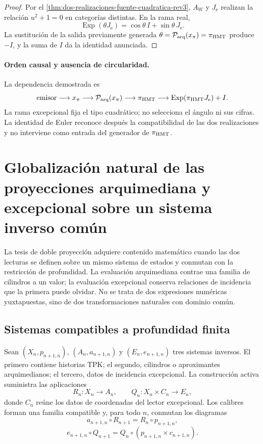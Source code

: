 \begin{proof}
Por el \cref{thm:dos-realizaciones-fuente-cuadratica-rev3}, \(A_W\) y
\(J_{\mathrm e}\) realizan la relación \(u^2+1=0\) en categorías distintas.
En la rama real,
\[
 \operatorname{Exp}(\theta J_{\mathrm e})
 =\cos\theta\,I+\sin\theta\,J_{\mathrm e}.
\]
La sustitución de la salida previamente generada
\(\theta=\mathcal P_{\rm arq}(x_\pi)=\pi_{\rm HMT}\) produce \(-I\), y la
suma de \(I\) da la identidad anunciada.
\end{proof}

\paragraph{Orden causal y ausencia de circularidad.}
La dependencia demostrada es
\[
 \text{emisor}
 \longrightarrow x_\pi
 \longrightarrow\mathcal P_{\rm arq}(x_\pi)
 \longrightarrow\pi_{\rm HMT}
 \longrightarrow
 \operatorname{Exp}(\pi_{\rm HMT}J_{\mathrm e})+I.
\]
La rama excepcional fija el tipo cuadrático; no selecciona el ángulo ni sus
cifras. La identidad de Euler reconoce después la compatibilidad de las dos
realizaciones y no interviene como entrada del generador de
\(\pi_{\rm HMT}\).


\section{Globalización natural de las proyecciones arquimediana y excepcional sobre un sistema inverso común}
\label{p12-83-c17-s3:chap:globalizacion-doble-proyeccion}

La tesis de doble proyección adquiere contenido matemático cuando las dos
lecturas se definen sobre un mismo sistema de estados y conmutan con la
restricción de profundidad. La evaluación arquimediana contrae una familia de
cilindros a un valor; la evaluación excepcional conserva relaciones de
incidencia que la primera puede olvidar. No se trata de dos expresiones
numéricas yuxtapuestas, sino de dos transformaciones naturales con dominio
común.

\subsection{Sistemas compatibles a profundidad finita}

Sean \((X_n,p_{n+1,n})\), \((A_n,a_{n+1,n})\) y
\((E_n,e_{n+1,n})\) tres sistemas inversos. El primero contiene historias
TPK; el segundo, cilindros o aproximantes arquimedianos; el tercero, datos de
incidencia excepcional. La construcción activa suministra las aplicaciones
\[
 R_n:X_n\longrightarrow A_n,
 \qquad
 Q_n:X_n\times C_n\longrightarrow E_n,
\]
donde \(C_n\) reúne los datos de coordenadas del lector excepcional. Los
calibres forman una familia compatible y, para todo \(n\), conmutan los
diagramas
\[
 a_{n+1,n}\circ R_{n+1}=R_n\circ p_{n+1,n},
\]
\[
 e_{n+1,n}\circ Q_{n+1}
 =Q_n\circ(p_{n+1,n}\times c_{n+1,n}).
\]

